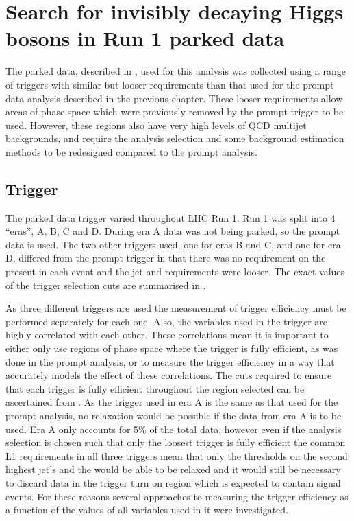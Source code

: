 \chapter{Search for invisibly decaying Higgs bosons in Run 1 parked data}
\label{chap:parked}
The parked data, described in , used for this analysis was collected using a range of triggers with similar but looser requirements than that used for the prompt data analysis described in the previous chapter. These looser requirements allow areas of phase space which were previously removed by the prompt trigger to be used. However, these regions also have very high levels of \ac{QCD} multijet backgrounds, and require the analysis selection and some background estimation methods to be redesigned compared to the prompt analysis.

\section{Trigger}%
\label{sec:parkedtrigger}
The parked data trigger varied throughout LHC Run 1. Run 1 was split into 4 ``eras'', A, B, C and D. During era A data was not being parked, so the prompt data is used. The two other triggers used, one for eras B and C, and one for era D, differed from the prompt trigger in that there was no requirement on the \MET present in each event and the jet \pt and \Mjj requirements were looser. The exact values of the trigger selection cuts are summarised in .

As three different triggers are used the measurement of trigger efficiency must be performed separately for each one. Also, the variables used in the trigger are highly correlated with each other. These correlations mean it is important to either only use regions of phase space where the trigger is fully efficient, as was done in the prompt analysis, or to measure the trigger efficiency in a way that accurately models the effect of these correlations. The cuts required to ensure that each trigger is fully efficient throughout the region selected can be ascertained from . As the trigger used in era A is the same as that used for the prompt analysis, no relaxation would be possible if the data from era A is to be used. Era A only accounts for 5\% of the total data, however even if the analysis selection is chosen such that only the loosest trigger is fully efficient the common \ac{L1} \MET requirements in all three triggers mean that only the thresholds on the second highest \pt jet's \pt and the \Mjj would be able to be relaxed and it would still be necessary to discard data in the trigger turn on region which is expected to contain signal events. For these reasons several approaches to measuring the trigger efficiency as a function of the values of all variables used in it were investigated.



